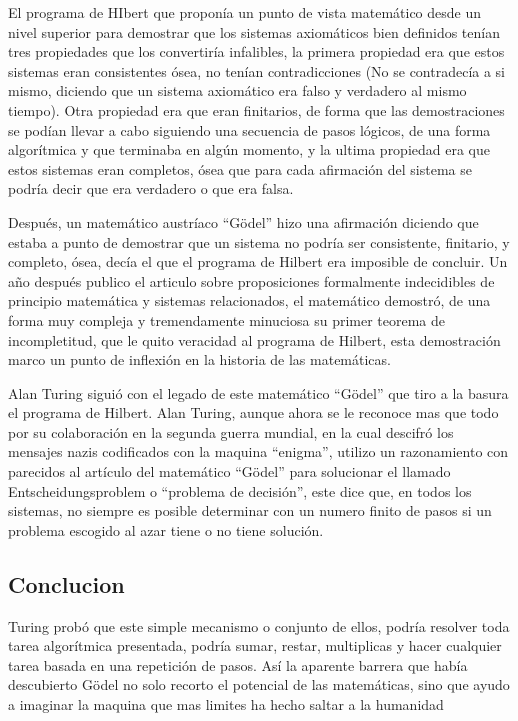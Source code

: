 \documentclass[a4paper]{article}
\begin{document}
El programa de HIbert que proponía un punto de vista matemático desde un nivel superior para demostrar que los sistemas axiomáticos bien definidos tenían tres propiedades que los convertiría infalibles, la primera propiedad era que estos sistemas eran consistentes ósea, no tenían contradicciones (No se contradecía a si mismo, diciendo que un sistema axiomático era falso y verdadero al mismo tiempo). Otra propiedad era que eran finitarios, de forma que las demostraciones se podían llevar a cabo siguiendo una secuencia de pasos lógicos, de una forma algorítmica y que terminaba en algún momento, y la ultima propiedad era que estos sistemas eran completos, ósea que para cada afirmación del sistema se podría decir que era verdadero o que era falsa.

Después, un matemático austríaco “Gödel” hizo una afirmación diciendo que estaba a punto de demostrar que un sistema no podría ser consistente, finitario, y completo, ósea, decía el que el programa de Hilbert era imposible de concluir. Un año después publico el articulo sobre proposiciones formalmente indecidibles de principio matemática y sistemas relacionados, el matemático demostró, de una forma muy compleja y tremendamente minuciosa su primer teorema de incompletitud, que le quito veracidad al programa de Hilbert, esta demostración marco un punto de inflexión en la historia de las matemáticas.

Alan Turing siguió con el legado de este matemático “Gödel” que tiro a la basura el programa de Hilbert. Alan Turing, aunque ahora se le reconoce mas que todo por su colaboración en la segunda guerra mundial, en la cual descifró los mensajes nazis codificados con la maquina “enigma”, utilizo un razonamiento con parecidos al artículo del matemático “Gödel” para solucionar el llamado Entscheidungsproblem o “problema de decisión”, este dice que, en todos los sistemas, no siempre es posible determinar con un numero finito de pasos si un problema escogido al azar tiene o no tiene solución.

\subsection{Conclucion}

Turing probó que este simple mecanismo o conjunto de ellos, podría resolver toda tarea algorítmica presentada, podría sumar, restar, multiplicas y hacer cualquier tarea basada en una repetición de pasos. Así la aparente barrera que había descubierto Gödel no solo recorto el potencial de las matemáticas, sino que ayudo a imaginar la maquina que mas limites ha hecho saltar a la humanidad
\end{document}
